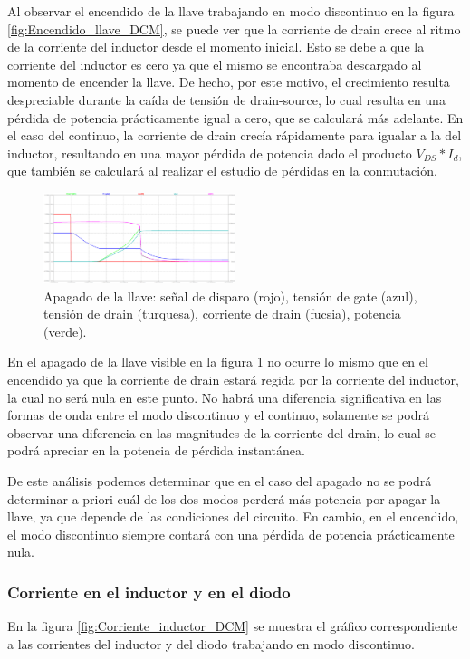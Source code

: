 \documentclass[e4_tp1_main.tex]{subfiles}
\begin{document}
	Al observar el encendido de la llave trabajando en modo discontinuo en la figura \ref{fig:Encendido_llave_DCM}, se puede ver que la corriente de drain crece al ritmo de la corriente del inductor desde el momento inicial. Esto se debe a que la corriente del inductor es cero ya que el mismo se encontraba descargado al momento de encender la llave. De hecho, por este motivo, el crecimiento resulta despreciable durante la caída de tensión de drain-source, lo cual resulta en una pérdida de potencia prácticamente igual a cero, que se calculará más adelante. En el caso del continuo, la corriente de drain crecía rápidamente para igualar a la del inductor, resultando en una mayor pérdida de potencia dado el producto $V_{DS}*I_d$, que también se calculará al realizar el estudio de pérdidas en la conmutación.
	
	\begin{figure}
		\centering
		\includegraphics[width=0.5\textwidth]{images/ej4/fig2.png}
		\caption{Apagado de la llave: señal de disparo (rojo), tensi\'on de gate (azul), tensi\'on de drain (turquesa), corriente de drain (fucsia), potencia (verde).}
		\label{fig:Apagado_llave_DCM}
		
	\end{figure}
	
	En el apagado de la llave visible en la figura \ref{fig:Apagado_llave_DCM} no ocurre lo mismo que en el encendido ya que la corriente de drain estará regida por la corriente del inductor, la cual no será nula en este punto. No habrá una diferencia significativa en las formas de onda entre el modo discontinuo y el continuo, solamente se podrá observar una diferencia en las magnitudes de la corriente del drain, lo cual  se podrá apreciar en la potencia de pérdida instantánea. 
	
	De este análisis podemos determinar que en el caso del apagado no se podrá determinar a priori cuál de los dos modos perderá más potencia por apagar la llave, ya que depende de las condiciones del circuito. En cambio, en el encendido, el modo discontinuo siempre contará con una pérdida de potencia prácticamente nula.
	
	
	\subsubsection{Corriente en el inductor y en el diodo}
	En la figura \ref{fig:Corriente_inductor_DCM} se muestra el gráfico correspondiente a las corrientes del inductor y del diodo trabajando en modo discontinuo.
	
\end{document}
